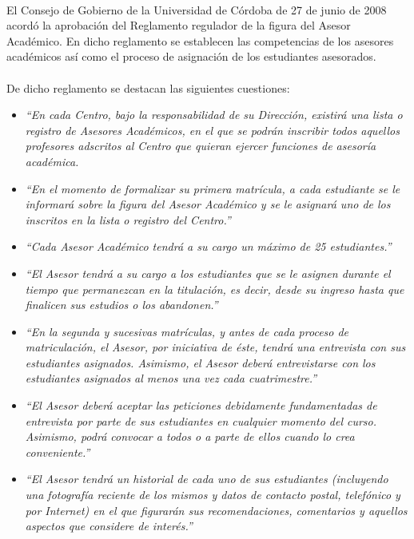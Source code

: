 \paragraph{}El Consejo de Gobierno de la Universidad de Córdoba de 27 de junio
de 2008 acordó la aprobación del Reglamento regulador de la figura del Asesor
Académico. En dicho reglamento se establecen las competencias de los asesores
académicos así como el proceso de asignación de los estudiantes asesorados.

\paragraph{}De dicho reglamento se destacan las siguientes cuestiones:

\begin{itemize}
   \item \textit{``En cada Centro, bajo la responsabilidad de su Dirección,
   existirá una lista o registro de Asesores Académicos, en el que se podrán
   inscribir todos aquellos profesores adscritos al Centro que quieran ejercer
   funciones de asesoría académica.}
   \item \textit{``En el momento de formalizar su primera matrícula, a cada
   estudiante se le informará sobre la figura del Asesor Académico y se le
   asignará uno de los inscritos en la lista o registro del Centro.''}
   \item \textit{``Cada Asesor Académico tendrá a su cargo un máximo de 25
   estudiantes.''}
   \item \textit{``El Asesor tendrá a su cargo a los estudiantes que se le
   asignen durante el tiempo que permanezcan en la titulación, es decir, desde
   su ingreso hasta que finalicen sus estudios o los abandonen.''}
   \item \textit{``En la segunda y sucesivas matrículas, y antes de cada proceso
   de matriculación, el Asesor, por iniciativa de éste, tendrá una entrevista
   con sus estudiantes asignados. Asimismo, el Asesor deberá entrevistarse con
   los estudiantes asignados al menos una vez cada cuatrimestre.''}
   \item \textit{``El Asesor deberá aceptar las peticiones debidamente
   fundamentadas de entrevista por parte de sus estudiantes en cualquier momento
   del curso. Asimismo, podrá convocar a todos o a parte de ellos cuando lo crea
   conveniente.''}
   \item \textit{``El Asesor tendrá un historial de cada uno de sus estudiantes
   (incluyendo una fotografía reciente de los mismos y datos de contacto postal,
   telefónico y por Internet) en el que figurarán sus recomendaciones,
   comentarios y aquellos aspectos que considere de interés.''}


\end{itemize}
